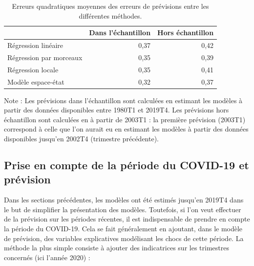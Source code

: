 \documentclass[
  a4paper,
  DIV=11,
  numbers=noendperiod,
  french]{scrartcl}
\newcommand\1{{\mathds 1}}
\theoremstyle{remark}
\begin{document}
\begin{longtable}[]{@{}lrr@{}}

\caption{\label{tbl-res-model-pib}Erreurs quadratiques moyennes des
erreurs de prévisions entre les différentes méthodes.}

\tabularnewline

\toprule\noalign{}
& Dans l'échantillon & Hors échantillon \\
\midrule\noalign{}
\endhead
\bottomrule\noalign{}
\endlastfoot
Régression linéaire & 0,37 & 0,42 \\
Régression par morceaux & 0,35 & 0,39 \\
Régression locale & 0,35 & 0,41 \\
Modèle espace-état & 0,32 & 0,37 \\

\end{longtable}

Note : Les prévisions dans l'échantillon sont calculées en estimant les
modèles à partir des données disponibles entre 1980T1 et 2019T4. Les
prévisions hors échantillon sont calculées en à partir de 2003T1 : la
première prévision (2003T1) correspond à celle que l'on aurait eu en
estimant les modèles à partir des données disponibles jusqu'en 2002T4
(trimestre précédente).

\subsection{Prise en compte de la période du COVID-19 et
prévision}\label{prise-en-compte-de-la-puxe9riode-du-covid-19-et-pruxe9vision}

Dans les sections précédentes, les modèles ont été estimés jusqu'en
2019T4 dans le but de simplifier la présentation des modèles. Toutefois,
si l'on veut effectuer de la prévision sur les périodes récentes, il est
indispensable de prendre en compte la période du COVID-19. Cela se fait
généralement en ajoutant, dans le modèle de prévision, des variables
explicatives modélisant les chocs de cette période. La méthode la plus
simple consiste à ajouter des indicatrices sur les trimestres concernés
(ici l'année 2020) :
\end{document}
